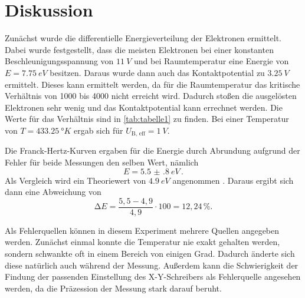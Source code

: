 \section{Diskussion}
\label{sec:Diskussion}

Zunächst wurde die differentielle Energieverteilung der Elektronen ermittelt.
Dabei wurde festgestellt, dass die meisten Elektronen bei einer konstanten Beschleunigungsspannung von $\qty{11}{V}$ und bei Raumtemperatur eine Energie von $E = \qty{7.75}{eV}$ besitzen.
Daraus wurde dann auch das Kontaktpotential zu $\qty{3.25}{V}$ ermittelt.
Dieses kann ermittelt werden, da für die Raumtemperatur das kritische Verhältnis von 1000 bis 4000 nicht erreicht wird.
Dadurch stoßen die ausgelösten Elektronen sehr wenig und das Kontaktpotential kann errechnet werden.
Die Werte für das Verhältnis sind in \autoref{tab:tabelle1} zu finden.
Bei einer Temperatur von $T = \qty{433.25}{°K}$ ergab sich für $U_\text{B, eff} = \qty{1}{V}$.

Die Franck-Hertz-Kurven ergaben für die Energie durch Abrundung aufgrund der Fehler für beide Messungen den selben Wert,
nämlich
\begin{equation}
    E = \qty{5.5(8)}{eV} \, .
\end{equation}
Als Vergleich wird ein Theoriewert von $\qty{4.9}{eV}$ angenommen \cite{Franck_Hertz}.
Daraus ergibt sich dann eine Abweichung von 
\begin{equation}
    \increment E = \frac{5,5 - 4,9}{4,9} \cdot 100 = 12,24 \, \%.
\end{equation}

Als Fehlerquellen können in diesem Experiment mehrere Quellen angegeben werden.
Zunächst einmal konnte die Temperatur nie exakt gehalten werden, sondern schwankte oft in einem Bereich von einigen Grad.
Dadurch änderte sich diese natürlich auch während der Messung.
Außerdem kann die Schwierigkeit der Findung der passenden Einstellung des X-Y-Schreibers als Fehlerquelle angesehen werden, da die Präzession der Messung stark darauf beruht.